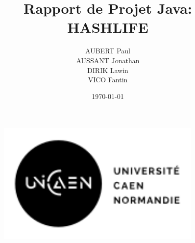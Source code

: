 \documentclass{myClass}
\title{Rapport de Projet Java: HASHLIFE}
\author{AUBERT Paul \\ AUSSANT Jonathan \\ DIRIK Lawin \\ VICO Fantin}
\date{\today}
\begin{document}
\begin{figure}
	\centering
	
		\includegraphics[width=0.9\textwidth]{images/2020_UNICAEN_LOGO_isotype-signature_horizontal_noir.png}
	
	\label{fig:game}
\end{figure}

\maketitle

\pagebreak

\tableofcontents



\nocite{*}

 
\end{document}
